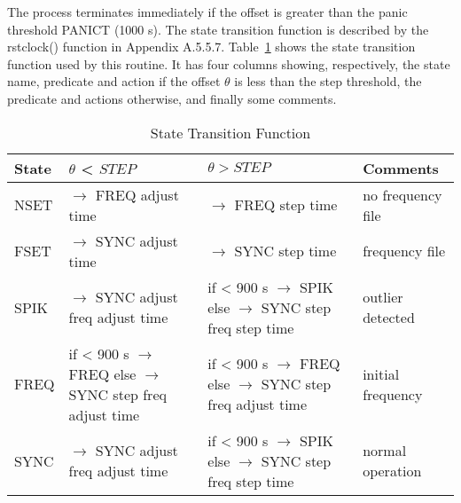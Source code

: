 The process terminates immediately if the offset is greater than the
panic threshold PANICT (1000 s). The state transition function is
described by the rstclock() function in Appendix A.5.5.7. Table~\ref{state_transition_function}
shows the state transition function used by this routine. It has
four columns showing, respectively, the state name, predicate and
action if the offset $ \theta $ is less than the step threshold, the
predicate and actions otherwise, and finally some comments.

\begin{table}[htb]
  \center
  \begin{tabular}{| l | l | l | l |}
    \hline
    State & $ \theta $ < $ STEP $        & $ \theta > STEP $      & Comments \\
    \hline
    \hline
    NSET & \makecell[l]{$ \rightarrow $ FREQ \\ adjust time} & \makecell[l]{$ \rightarrow $ FREQ \\ step time} & no frequency file \\
    FSET & \makecell[l]{$ \rightarrow $ SYNC \\ adjust time} & \makecell[l]{$ \rightarrow $ SYNC \\ step time} & frequency file \\
    SPIK & \makecell[l]{$ \rightarrow $ SYNC \\ adjust freq \\ adjust time} & \makecell[l]{if < 900 s $ \rightarrow $ SPIK \\ else $ \rightarrow $ SYNC \\ step freq \\ step time} & outlier detected \\
    FREQ & \makecell[l]{if < 900 s $ \rightarrow $ FREQ \\ else $ \rightarrow $ SYNC \\ step freq \\ adjust time} & \makecell[l]{if < 900 s $ \rightarrow $ FREQ \\ else $ \rightarrow $ SYNC \\ step freq \\ adjust time} & initial frequency \\
    SYNC & \makecell[l]{$ \rightarrow $ SYNC \\ adjust freq \\ adjust time} & \makecell[l]{if < 900 s $ \rightarrow $ SPIK \\ else $ \rightarrow $ SYNC \\ step freq \\ step time} & normal operation \\
    \hline
  \end{tabular}
  \caption{State Transition Function}
  \label{state_transition_function}
\end{table}

